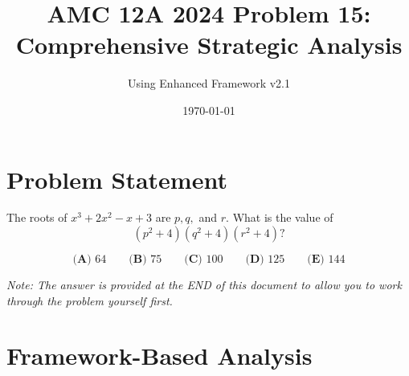 \documentclass[12pt]{article}
\title{\textbf{AMC 12A 2024 Problem 15:\\Comprehensive Strategic Analysis}}
\author{Using Enhanced Framework v2.1}
\date{\today}
\begin{document}
\maketitle

\section*{Problem Statement}

The roots of $x^3 + 2x^2 - x + 3$ are $p, q,$ and $r.$ What is the value of
\[(p^2 + 4)(q^2 + 4)(r^2 + 4)?\]

$$\textbf{(A) } 64 \qquad \textbf{(B) } 75 \qquad \textbf{(C) } 100 \qquad \textbf{(D) } 125 \qquad \textbf{(E) } 144$$

\vspace{1em}
\noindent\textit{Note: The answer is provided at the END of this document to allow you to work through the problem yourself first.}

\section*{Framework-Based Analysis}
\end{document}
